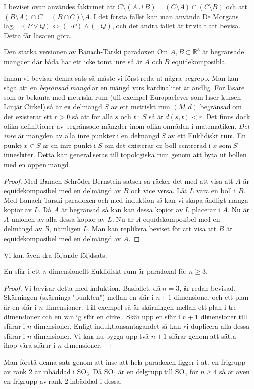 \documentclass{article}
\theoremstyle{definition}
\begin{document}
I beviset ovan användes faktumet att $C \setminus (A \cup B) = (C \setminus A) \cap (C \setminus B)$ och att $(B \setminus A) \cap C = (B \cap C) \setminus A$. 
I det första fallet kan man använda De Morgans lag, $\neg (P \vee  Q) \iff (\neg P) \wedge (\neg Q)$, och det andra fallet är trivialt att bevisa. 
Detta får läsaren göra.
\begin{mytheo}{Den starka versionen av Banach-Tarski paradoxen}{}
  Om $A, B \subset \mathbb{R}^3$ är begränsade mängder där båda har ett icke tomt inre så är $A$ och $B$ equidekomposibla.
\end{mytheo}

Innan vi bevisar denna sats så måste vi först reda ut några begrepp. Man kan säga att en \textit{begränsad mängd} är en mängd vars 
kardinalitet är ändlig. För läsare som är bekanta med metriska rum (till exempel Europaelever som läser kursen Linjär Cirkel)
så är en delmängd $S$ av ett metriskt rum $(M, d)$ begränsad om det existerar ett $r > 0$ så att för alla 
$s$ och $t$ i $S$ så är $d(s, t) < r$. Det finns dock olika definitioner av begränsade mängder inom olika områden i matematiken.
\textit{Det inre} är mängden av alla inre punkter i en delmängd $S$ av ett Euklidiskt rum. En punkt $x \in S$ är en inre punkt i $S$
om det existerar en boll centrerad i $x$ som $S$ innesluter. Detta kan generaliseras till topologiska rum genom att byta ut bollen med en öppen mängd.

\begin{proof}
  Med Banach-Schröder-Bernstein satsen så räcker det med att visa att $A$ är equidekomposibel med en delmängd av $B$ och vice versa. 
  Låt $L$ vara en boll i $B$. Med Banach-Tarski paradoxen och med induktion så kan vi skapa ändligt många kopior av $L$. Då $A$ är begränsad så 
  kan kan dessa kopior av $L$ placerar i $A$. Nu är $A$ unionen av alla dessa kopior av $L$. Nu är $A$ equidekomposibel med en delmängd av $B$, 
  nämligen $L$. Man kan replikera beviset för att visa att $B$ är equidekomposibel med en delmängd av $A$.
\end{proof}

Vi kan även dra följande följdsats.

\begin{mykol}{}{}
  En sfär i ett $n$-dimensionellt Euklidiskt rum är paradoxal för $n \geq 3$. 
\end{mykol}
\begin{proof}
  Vi bevisar detta med induktion. Basfallet, då $n = 3$, är redan bevisad. Skärningen (skärnings-"punkten") mellan en sfär i $n+1$ dimensioner 
  och ett plan är en sfär i $n$ dimensioner. Till exempel så är skärningen mellan ett plan i tre dimensioner och en vanlig sfär en cirkel. 
  Skär upp en sfär i $n+1$ dimensioner till sfärar i $n$ dimensioner. Enligt induktionsantagandet så kan vi duplicera alla dessa 
  sfärar i $n$ dimensioner. Vi kan nu bygga upp två $n+1$ sfärar genom att sätta ihop våra sfärar i $n$ dimensioner.
\end{proof}
Man förstå denna sats genom att inse att hela paradoxen ligger i att en frigrupp av rank 2 är inbäddad i $\text{SO}_3$. Då $\text{SO}_3$
är en delgrupp till $\text{SO}_n$ för $n \geq 4$ så är även en frigrupp av rank 2 inbäddad i dessa.
\end{document}
